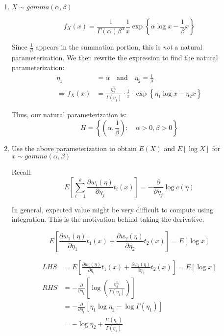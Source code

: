 \documentclass{article}
\begin{document}
\begin{enumerate}
    \item $X \sim gamma(\alpha,\beta)$
    
    \begin{equation*}
        f_X(x) = \frac{1}{\Gamma(\alpha)\beta^\alpha} \frac{1}{x} \exp\left\{ \alpha \log x - \frac{1}{\beta} x\right\}
    \end{equation*}
    
    Since $\frac{1}{\beta}$ appears in the summation portion, this is \textit{not} a natural parameterization. We then rewrite the expression to find the natural parameterization:
    \begin{equation*}
        \begin{split}
            \eta_1 &= \alpha \quad \text{and} \quad \eta_2 = \frac{1}{\beta}\\
            \Rightarrow f_X(x) &= \frac{\eta_2^{\eta_1}}{\Gamma(\eta_1)}\cdot \frac{1}{x}\cdot  \exp\left\{ \eta_1 \log x - \eta_2 x\right\}
        \end{split}
    \end{equation*}
    
    Thus, our natural parameterization is:
    \begin{equation*}
        H = \left\{\left(\alpha,\frac{1}{\beta}\right): \quad \alpha>0, \beta>0  \right\}
    \end{equation*}
    
    
    \item Use the above parameterization to obtain $E(X)$ and $E[\log X]$ for $x \sim gamma(\alpha,\beta)$
    
    Recall:
    \begin{equation*}
        E\left[\sum_{i=1}^k \frac{\partial w_i(\eta)}{\partial \eta_j} t_i(x) \right] = - \frac{\partial}{\partial \eta_j} \log c(\eta)
    \end{equation*}
    
    In general, expected value might be very difficult to compute using integration. This is the motivation behind taking the derivative.
    
    \begin{equation*}
        E\left[ \frac{\partial w_1(\eta)}{\partial \eta_1} t_1(x) + \frac{\partial w_2(\eta)}{\partial \eta_2} t_2(x) \right] = E[\log x]
    \end{equation*}
    
    \begin{equation*}
        \begin{split}
            LHS &= E\left[ \frac{\partial w_1(\eta)}{\partial \eta_1} t_1(x) + \frac{\partial w_2(\eta)}{\partial \eta_2} t_2(x) \right] = E[\log x]\\
            RHS &= -\frac{\partial}{\partial \eta_1}\left[\log\left( \frac{\eta_2^{\eta_1}}{\Gamma(\eta_1)} \right) \right]\\
            &= -\frac{\partial}{\partial \eta_1}\left[\eta_1 \log\eta_2 - \log \Gamma(\eta_1) \right]\\
            &= - \log \eta_2 + \frac{\Gamma'(\eta_1)}{\Gamma(\eta_1)}
        \end{split}
    \end{equation*}
    

\end{enumerate}
\end{document}
